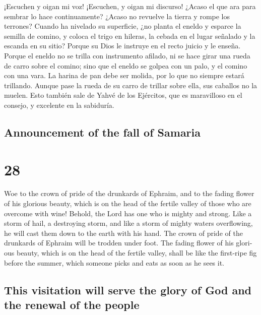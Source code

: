 \begin{paracol}{2}
 ¡Escuchen y oigan mi voz! ¡Escuchen, y oigan mi
discurso!  ¿Acaso el que ara para sembrar lo hace
continuamente? ¿Acaso no revuelve la tierra y rompe los terrones?
 Cuando ha nivelado su superficie, ¿no planta el eneldo y
esparce la semilla de comino, y coloca el trigo en hileras, la cebada en
el lugar señalado y la escanda en su sitio?  Porque su
Dios le instruye en el recto juicio y le enseña.  Porque
el eneldo no se trilla con instrumento afilado, ni se hace girar una
rueda de carro sobre el comino; sino que el eneldo se golpea con un
palo, y el comino con una vara.  La harina de pan debe
ser molida, por lo que no siempre estará trillando. Aunque pase la rueda
de su carro de trillar sobre ella, sus caballos no la muelen.
 Esto también sale de Yahvé de los Ejércitos, que es
maravilloso en el consejo, y excelente en la sabiduría.

\switchcolumn
\begin{otherlanguage}{english}

\hypertarget{announcement-of-the-fall-of-samaria}{%
\subsection{Announcement of the fall of
Samaria}\label{announcement-of-the-fall-of-samaria}}

\hypertarget{section-55}{%
\section{28}\label{section-55}}

 Woe to the crown of pride of the drunkards of Ephraim,
and to the fading flower of his glorious beauty, which is on the head of
the fertile valley of those who are overcome with wine! 
Behold, the Lord has one who is mighty and strong. Like a storm of hail,
a destroying storm, and like a storm of mighty waters overflowing, he
will cast them down to the earth with his hand.  The crown
of pride of the drunkards of Ephraim will be trodden under foot.
 The fading flower of his glorious beauty, which is on the
head of the fertile valley, shall be like the first-ripe fig before the
summer, which someone picks and eats as soon as he sees it.

\hypertarget{this-visitation-will-serve-the-glory-of-god-and-the-renewal-of-the-people}{%
\subsection{This visitation will serve the glory of God and the renewal
of the
people}\label{this-visitation-will-serve-the-glory-of-god-and-the-renewal-of-the-people}}


\end{otherlanguage}
\end{paracol}
